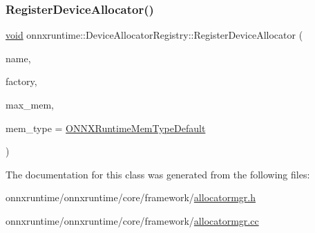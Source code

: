 \subsubsection{\texorpdfstring{Register\+Device\+Allocator()}{RegisterDeviceAllocator()}}
{\footnotesize\ttfamily \mbox{\hyperlink{mlasi_8h_a88f941d423cb2a819b70a1358982b1a6}{void}} onnxruntime\+::\+Device\+Allocator\+Registry\+::\+Register\+Device\+Allocator (\begin{DoxyParamCaption}\item[{std\+::string \&\&}]{name,  }\item[{\mbox{\hyperlink{namespaceonnxruntime_ae1af56abbcfb3524284e0de4567f94ac}{Device\+Allocator\+Factory}}}]{factory,  }\item[{\mbox{\hyperlink{mlasi_8h_a503efbc1c6e50825320ad909366b78ab}{size\+\_\+t}}}]{max\+\_\+mem,  }\item[{\mbox{\hyperlink{allocator__info_8h_add3f8ee3ff93395704abae71c30cab18}{O\+N\+N\+X\+Runtime\+Mem\+Type}}}]{mem\+\_\+type = {\ttfamily \mbox{\hyperlink{allocator__info_8h_add3f8ee3ff93395704abae71c30cab18a232271cbf46c229ed40272a63af7a204}{O\+N\+N\+X\+Runtime\+Mem\+Type\+Default}}} }\end{DoxyParamCaption})\hspace{0.3cm}{\ttfamily [inline]}}



The documentation for this class was generated from the following files\+:\begin{DoxyCompactItemize}
\item 
onnxruntime/onnxruntime/core/framework/\mbox{\hyperlink{allocatormgr_8h}{allocatormgr.\+h}}\item 
onnxruntime/onnxruntime/core/framework/\mbox{\hyperlink{allocatormgr_8cc}{allocatormgr.\+cc}}\end{DoxyCompactItemize}
